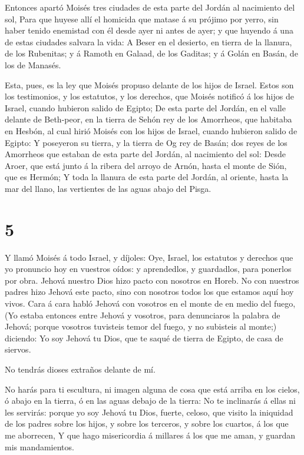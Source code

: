  Entonces apartó Moisés tres ciudades de esta parte del
Jordán al nacimiento del sol,  Para que huyese allí el
homicida que matase á su prójimo por yerro, sin haber tenido enemistad
con él desde ayer ni antes de ayer; y que huyendo á una de estas
ciudades salvara la vida:  A Beser en el desierto, en
tierra de la llanura, de los Rubenitas; y á Ramoth en Galaad, de los
Gaditas; y á Golán en Basán, de los de Manasés.

 Esta, pues, es la ley que Moisés propuso delante de los
hijos de Israel.  Estos son los testimonios, y los
estatutos, y los derechos, que Moisés notificó á los hijos de Israel,
cuando hubieron salido de Egipto;  De esta parte del
Jordán, en el valle delante de Beth-peor, en la tierra de Sehón rey de
los Amorrheos, que habitaba en Hesbón, al cual hirió Moisés con los
hijos de Israel, cuando hubieron salido de Egipto:  Y
poseyeron su tierra, y la tierra de Og rey de Basán; dos reyes de los
Amorrheos que estaban de esta parte del Jordán, al nacimiento del sol:
 Desde Aroer, que está junto á la ribera del arroyo de
Arnón, hasta el monte de Sión, que es Hermón;  Y toda la
llanura de esta parte del Jordán, al oriente, hasta la mar del llano,
las vertientes de las aguas abajo del Pisga.

\hypertarget{section-4}{%
\section{5}\label{section-4}}

 Y llamó Moisés á todo Israel, y díjoles: Oye, Israel, los
estatutos y derechos que yo pronuncio hoy en vuestros oídos: y
aprendedlos, y guardadlos, para ponerlos por obra.  Jehová
nuestro Dios hizo pacto con nosotros en Horeb.  No con
nuestros padres hizo Jehová este pacto, sino con nosotros todos los que
estamos aquí hoy vivos.  Cara á cara habló Jehová con
vosotros en el monte de en medio del fuego,  (Yo estaba
entonces entre Jehová y vosotros, para denunciaros la palabra de Jehová;
porque vosotros tuvisteis temor del fuego, y no subisteis al monte;)
diciendo:  Yo soy Jehová tu Dios, que te saqué de tierra de
Egipto, de casa de siervos.

 No tendrás dioses extraños delante de mí.

 No harás para ti escultura, ni imagen alguna de cosa que
está arriba en los cielos, ó abajo en la tierra, ó en las aguas debajo
de la tierra:  No te inclinarás á ellas ni les servirás:
porque yo soy Jehová tu Dios, fuerte, celoso, que visito la iniquidad de
los padres sobre los hijos, y sobre los terceros, y sobre los cuartos, á
los que me aborrecen,  Y que hago misericordia á millares á
los que me aman, y guardan mis mandamientos.

